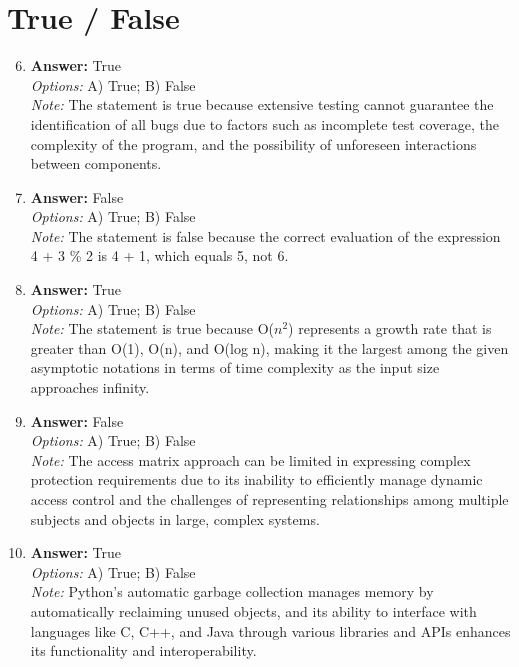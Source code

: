 \documentclass[12pt]{article}
\begin{document}
\section*{True / False}
\begin{enumerate}[label=\arabic*.]
\setcounter{enumi}{5}
\item \textbf{Answer:} True
\\ \textit{Options:} A) True; B) False
\\ \textit{Note:} The statement is true because extensive testing cannot guarantee the identification of all bugs due to factors such as incomplete test coverage, the complexity of the program, and the possibility of unforeseen interactions between components.
\item \textbf{Answer:} False
\\ \textit{Options:} A) True; B) False
\\ \textit{Note:} The statement is false because the correct evaluation of the expression 4 + 3 \% 2 is 4 + 1, which equals 5, not 6.
\item \textbf{Answer:} True
\\ \textit{Options:} A) True; B) False
\\ \textit{Note:} The statement is true because O($n^2$) represents a growth rate that is greater than O(1), O(n), and O(log n), making it the largest among the given asymptotic notations in terms of time complexity as the input size approaches infinity.
\item \textbf{Answer:} False
\\ \textit{Options:} A) True; B) False
\\ \textit{Note:} The access matrix approach can be limited in expressing complex protection requirements due to its inability to efficiently manage dynamic access control and the challenges of representing relationships among multiple subjects and objects in large, complex systems.
\item \textbf{Answer:} True
\\ \textit{Options:} A) True; B) False
\\ \textit{Note:} Python's automatic garbage collection manages memory by automatically reclaiming unused objects, and its ability to interface with languages like C, C++, and Java through various libraries and APIs enhances its functionality and interoperability.
\end{enumerate}
\end{document}

